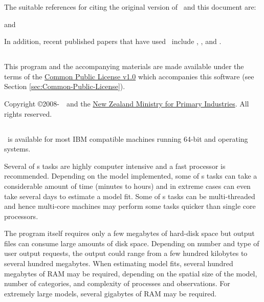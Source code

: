 The suitable references for citing the original version of \SPM\ and this document are:

\OriginalRef

and

\ManualRef{}

In addition, recent published papers that have used \SPM\ include \cite{Marsh_Sibanda_Dunn_Dunn_2015}, \cite{Mormede_Dunn_Parker_Hanchet_2017}, and \cite{Mormede_Parker_Pinkerton_2020}.

\subsection{}

This program and the accompanying materials are made available under the terms of the \href{http://www.opensource.org/licenses/cpl1.0.php}{Common Public License v1.0} which accompanies this software (see Section \ref{sec:Common-Public-License}).

Copyright \copyright 2008-\SourceControlYearDoc\ \NIWA\ and the \href{http://www.mpi.govt.nz}{New Zealand Ministry for Primary Industries}. All rights reserved.

\subsection{}

\SPM\ is available for most IBM compatible machines running 64-bit  and  operating systems.

Several of \SPM s tasks are highly computer intensive and a fast processor is recommended. Depending on the model implemented, some of \SPM s tasks can take a considerable amount of time (minutes to hours) and in extreme cases can even take several days to estimate a model fit. Some of \SPM s tasks can be multi-threaded and hence multi-core machines may perform some tasks quicker than single core processors.

The program itself requires only a few megabytes of hard-disk space but output files can consume large amounts of disk space. Depending on number and type of user output requests, the output could range from a few hundred kilobytes to several hundred megabytes. When estimating model fits, several hundred megabytes of RAM may be required, depending on the spatial size of the model, number of categories, and complexity of processes and observations. For extremely large models, several gigabytes of RAM may be required. 

